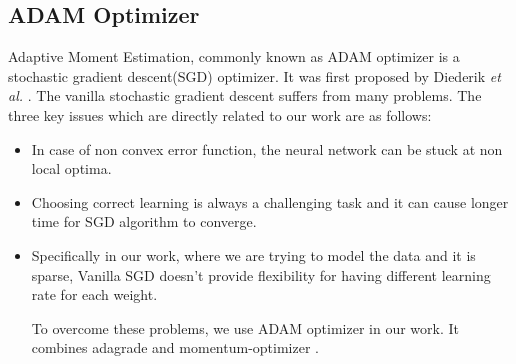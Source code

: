 \subsection{ADAM Optimizer}

Adaptive Moment Estimation, commonly known as ADAM optimizer is a stochastic gradient descent(SGD) optimizer. It was first proposed by Diederik \textit{et al.} \cite{Adam}. The vanilla stochastic gradient descent suffers from many problems. The three key issues which are directly related to our work are as follows:
\begin{itemize}
    \item In case of non convex error function, the neural network can be stuck at non local optima.
    \item Choosing correct learning is always a challenging task and it can cause longer time for SGD algorithm to converge.
    \item Specifically in our work, where we are trying to model the data and it is sparse, Vanilla SGD doesn't provide flexibility for having different learning rate for each weight.

To overcome these problems, we use ADAM optimizer in our work. It combines adagrade\cite{Adagrade} and momentum-optimizer \cite{momentum}. 

\end{itemize}
 
 
 